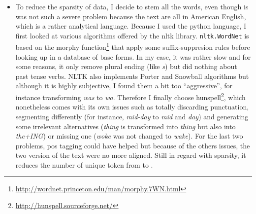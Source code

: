 \begin{itemize}
\item To reduce the sparsity of data, I decide to stem all the words, even though is was not such a severe problem because the text are all in American English, which is a rather analytical language. Because I used the python language, I first looked at various algorithms offered by the \gls{nltk} library\autocite{bird2009nltk}. \texttt{nltk.WordNet} is based on the morphy function\footnote{\href{http://wordnet.princeton.edu/man/morphy.7WN.html}{http://wordnet.princeton.edu/man/morphy.7WN.html}} that apply some suffix-suppresion rules before looking up in a database of base forms. In my case, it was rather slow and for some reasons, it only remove plural ending (like \emph{s}) but did nothing about past tense verbs. NLTK also implements Porter\autocite{porter1980algo} and Snowball\autocite{porter2001snowball} algorithms but although it is highly subjective, I found them a bit too \enquote{aggressive}, for instance transforming \emph{was} to \emph{wa}.  Therefore I finally choose hunspell\footnote{\href{http://hunspell.sourceforge.net/}{http://hunspell.sourceforge.net/}}, which nonetheless comes with its own issues such as totally discarding punctuation, segmenting differently (for instance, \emph{mid-day} to \emph{mid} and \emph{day}) and generating some irrelevant alternatives (\emph{thing} is transformed into \emph{thing} but also into \emph{the+ING}) or missing one (\emph{woke} was not changed to \emph{wake}). For the last two problems, \gls{pos} tagging could have helped but because of the others issues, the two version of the text were no more aligned. Still in regard with sparsity, it reduces the number of unique token from  to .


\end{itemize}

